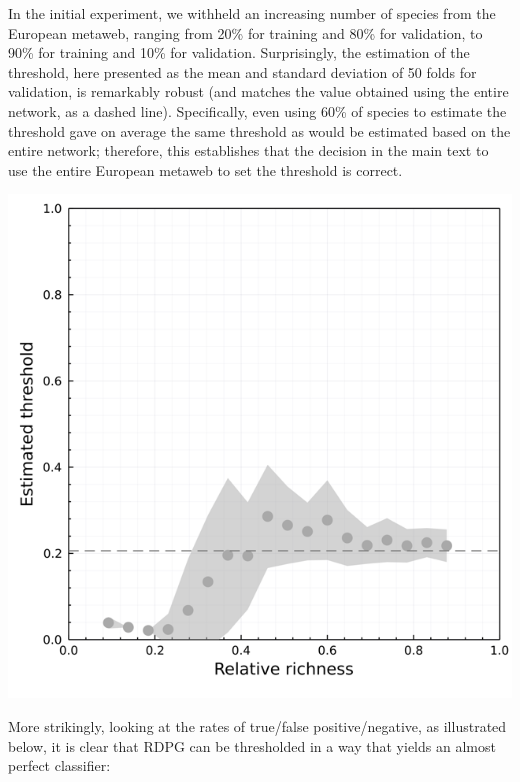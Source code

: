 In the initial experiment, we withheld an increasing number of species
from the European metaweb, ranging from 20\% for training and 80\% for
validation, to 90\% for training and 10\% for validation. Surprisingly,
the estimation of the threshold, here presented as the mean and standard
deviation of 50 folds for validation, is remarkably robust (and matches
the value obtained using the entire network, as a dashed line).
Specifically, even using 60\% of species to estimate the threshold gave
on average the same threshold as would be estimated based on the entire
network; therefore, this establishes that the decision in the main text
to use the entire European metaweb to set the threshold is correct.

\includegraphics[width=\textwidth]{./figures/supplementary/sensibility_threshold_species.png}

More strikingly, looking at the rates of true/false positive/negative,
as illustrated below, it is clear that RDPG can be thresholded in a way
that yields an almost perfect classifier:

